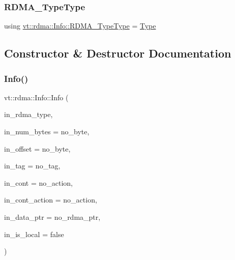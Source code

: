 \subsubsection{\texorpdfstring{R\+D\+M\+A\+\_\+\+Type\+Type}{RDMA\_TypeType}}
{\footnotesize\ttfamily using \hyperlink{namespacevt_1_1rdma_ac848e1d9da43db6294bd06f83e5d3946}{vt\+::rdma\+::\+Info\+::\+R\+D\+M\+A\+\_\+\+Type\+Type} =  \hyperlink{namespacevt_1_1rdma_ac848e1d9da43db6294bd06f83e5d3946}{Type}}



\subsection{Constructor \& Destructor Documentation}
\mbox{\label{structvt_1_1rdma_1_1_info_a9f79490fb7f166889a8cfed10d158d38}} 
\subsubsection{\texorpdfstring{Info()}{Info()}}
{\footnotesize\ttfamily vt\+::rdma\+::\+Info\+::\+Info (\begin{DoxyParamCaption}\item[{\hyperlink{namespacevt_1_1rdma_ac848e1d9da43db6294bd06f83e5d3946}{R\+D\+M\+A\+\_\+\+Type\+Type} const \&}]{in\+\_\+rdma\+\_\+type,  }\item[{\hyperlink{namespacevt_aab8d55968084610ce3b17057981e9300}{Byte\+Type} const \&}]{in\+\_\+num\+\_\+bytes = {\ttfamily no\+\_\+byte},  }\item[{\hyperlink{namespacevt_aab8d55968084610ce3b17057981e9300}{Byte\+Type} const \&}]{in\+\_\+offset = {\ttfamily no\+\_\+byte},  }\item[{\hyperlink{namespacevt_a84ab281dae04a52a4b243d6bf62d0e52}{Tag\+Type} const \&}]{in\+\_\+tag = {\ttfamily no\+\_\+tag},  }\item[{\hyperlink{namespacevt_a9880273f1697d78c2171f8d8f044de51}{R\+D\+M\+A\+\_\+\+Continuation\+Type}}]{in\+\_\+cont = {\ttfamily no\+\_\+action},  }\item[{\hyperlink{namespacevt_ae0a5a7b18cc99d7b732cb4d44f46b0f3}{Action\+Type}}]{in\+\_\+cont\+\_\+action = {\ttfamily no\+\_\+action},  }\item[{\hyperlink{namespacevt_aab05b4a584f7ee835a6d0f66915cf59b}{R\+D\+M\+A\+\_\+\+Ptr\+Type} const \&}]{in\+\_\+data\+\_\+ptr = {\ttfamily no\+\_\+rdma\+\_\+ptr},  }\item[{bool const}]{in\+\_\+is\+\_\+local = {\ttfamily false} }\end{DoxyParamCaption})\hspace{0.3cm}{\ttfamily [inline]}}



